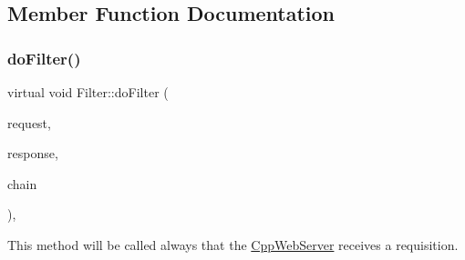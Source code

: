 \subsection{Member Function Documentation}
\mbox{\label{class_filter_a2fc7a0f47fb3c9ebb1e377108fe8850c}} 
\subsubsection{\texorpdfstring{do\+Filter()}{doFilter()}}
{\footnotesize\ttfamily virtual void Filter\+::do\+Filter (\begin{DoxyParamCaption}\item[{C\+W\+F\+::\+Http\+Servlet\+Request \&}]{request,  }\item[{C\+W\+F\+::\+Http\+Servlet\+Response \&}]{response,  }\item[{\hyperlink{class_filter_chain}{Filter\+Chain} \&}]{chain }\end{DoxyParamCaption})\hspace{0.3cm}{\ttfamily [inline]}, {\ttfamily [virtual]}}



This method will be called always that the \hyperlink{class_cpp_web_server}{Cpp\+Web\+Server} receives a requisition. 


